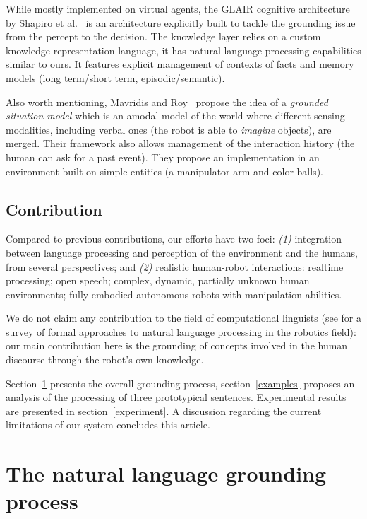 While mostly implemented on virtual agents, the GLAIR cognitive architecture
by Shapiro et al.~\cite{Shapiro2009} is an architecture
explicitly built to tackle the grounding issue from the percept to the
decision. The knowledge layer relies on a custom knowledge representation
language, it has natural language processing capabilities similar to ours. It
features explicit management of contexts of facts and memory models (long
term/short term, episodic/semantic).

Also worth mentioning, Mavridis and Roy~\cite{Mavridis2005} propose the idea of
a \emph{grounded situation model} which is an amodal model of the world where
different sensing modalities, including verbal ones (the robot is able to
\emph{imagine} objects), are merged. Their framework also allows management of
the interaction history (the human can ask for a past event). They propose an
implementation in an environment built on simple entities (a manipulator arm
and color balls).

\subsection{Contribution}

Compared to previous contributions, our efforts have two foci: {\it (1)}
integration between language processing and perception of the environment and
the humans, from several perspectives; and {\it (2)} realistic human-robot interactions:
realtime processing; open speech; complex, dynamic, partially unknown human environments; fully
embodied autonomous robots with manipulation abilities. 

We do not claim any contribution to the field of computational linguists (see
\cite{Kruijff2010} for a survey of formal approaches to natural language
processing in the robotics field): our main contribution here is the grounding
of concepts involved in the human discourse through the robot's own knowledge.

Section~\ref{dialog} presents the overall grounding process, section~\ref{examples} 
proposes an analysis of the processing of three prototypical sentences. 
Experimental results are presented in section~\ref{experiment}. A 
discussion regarding the current limitations of our system concludes
this article.

\section{The natural language grounding process}
\label{dialog}

